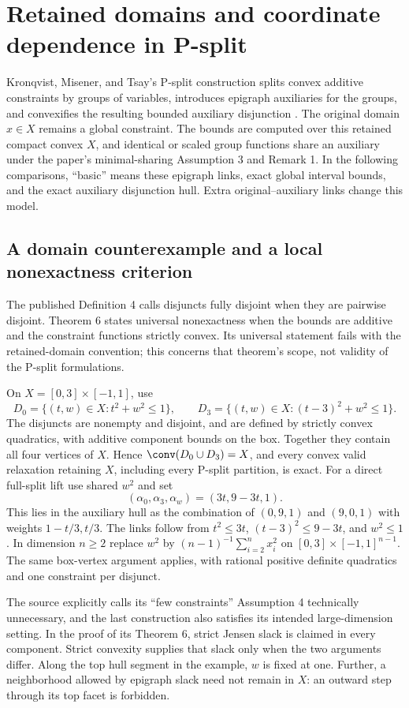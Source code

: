 \section{Retained domains and coordinate dependence in P-split}
\label{app:p-split}
Kronqvist, Misener, and Tsay's P-split construction splits convex additive
constraints by groups of variables, introduces epigraph auxiliaries for
the groups, and convexifies the resulting bounded auxiliary disjunction
\citep[Sections 2--4]{KronqvistEtAl2026}. The original domain $x\in X$
remains a global constraint. The bounds are computed over this retained
compact convex $X$, and identical or scaled group functions share an
auxiliary under the paper's minimal-sharing Assumption 3 and Remark 1.
In the following comparisons, ``basic'' means these epigraph links,
exact global interval bounds, and the exact auxiliary disjunction hull.
Extra original--auxiliary links change this model.

\subsection{A domain counterexample and a local nonexactness criterion}
The published Definition 4 calls disjuncts fully disjoint when they are
pairwise disjoint. Theorem 6 states universal nonexactness when the
bounds are additive and the constraint functions strictly convex. Its
universal statement fails with the retained-domain convention; this
concerns that theorem's scope, not validity of the P-split formulations.

\begin{example}\label{ex:psplit-exact-box}
On $X=[0,3]\times[-1,1]$, use
\[
 D_0=\{(t,w)\in X:t^2+w^2\le1\},\qquad
 D_3=\{(t,w)\in X:(t-3)^2+w^2\le1\}.
\]
The disjuncts are nonempty and disjoint, and are defined by strictly convex
quadratics, with additive component bounds on the box. Together they contain
all four vertices of $X$. Hence $\conv(D_0\cup D_3)=X$, and every convex
valid relaxation retaining $X$, including every P-split partition, is exact.
For a direct full-split lift use shared $w^2$ and set
\[
 (\alpha_0,\alpha_3,\alpha_w)=(3t,9-3t,1).
\]
This lies in the auxiliary hull as the combination of $(0,9,1)$ and
$(9,0,1)$ with weights $1-t/3,t/3$. The links follow from
$t^2\le3t$, $(t-3)^2\le9-3t$, and $w^2\le1$. In dimension $n\ge2$
replace $w^2$ by $(n-1)^{-1}\sum_{i=2}^n x_i^2$ on
$[0,3]\times[-1,1]^{n-1}$. The same box-vertex argument applies,
with rational positive definite quadratics and one constraint per disjunct.
\end{example}
The source explicitly calls its ``few constraints'' Assumption 4
technically unnecessary, and the last construction also satisfies its
intended large-dimension setting. In the proof of its Theorem 6, strict
Jensen slack is claimed in every component. Strict convexity supplies
that slack only when the two arguments differ. Along the top hull
segment in the example, $w$ is fixed at one. Further, a neighborhood
allowed by epigraph slack need not remain in $X$: an outward step
through its top facet is forbidden.

